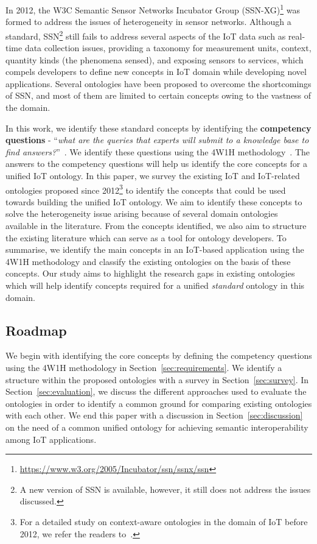 \documentclass{elsart}  %
\begin{document}
In 2012, the W3C Semantic Sensor Networks Incubator Group (SSN-XG)\footnote{\url{https://www.w3.org/2005/Incubator/ssn/ssnx/ssn}} was formed to address the issues of heterogeneity in sensor networks. Although a standard, SSN\footnote{A new version of SSN is available, however, it still does not address the issues discussed.} still fails to address several aspects of the IoT data such as real-time data collection issues, providing a taxonomy for measurement units, context, quantity kinds (the phenomena sensed), and exposing sensors to services, which compels developers to define new concepts in IoT domain while developing novel applications. Several ontologies have been proposed to overcome the shortcomings of SSN, and most of them are limited to certain concepts owing to the vastness of the domain.

In this work, we identify these standard concepts by identifying the \textbf{competency questions} - ``\emph{what are the queries that experts will submit to a knowledge base to find answers?}''~\cite{yan2015ontology}. We identify these questions using the 4W1H methodology~\cite{4w1hDescribing,4w1hcrowdsensing}. The answers to the competency questions will help us identify the core concepts for a unified IoT ontology. In this paper, we survey the existing IoT and IoT-related ontologies proposed since 2012\footnote{For a detailed study on context-aware ontologies in the domain of IoT before 2012, we refer the readers to~\cite{perera2014context}.} to identify the concepts that could be used towards building the unified IoT ontology. We aim to identify these concepts to solve the heterogeneity issue arising because of several domain ontologies available in the literature. From the concepts identified, we also aim to structure the existing literature which can serve as a tool for ontology developers. To summarise, we identify the main concepts in an IoT-based application using the 4W1H methodology and classify the existing ontologies on the basis of these concepts. Our study aims to highlight the research gaps in existing ontologies which will help identify concepts required for a unified \emph{standard} ontology in this domain.
\subsection*{Roadmap}
We begin with identifying the core concepts by defining the competency questions using the 4W1H methodology in Section~\ref{sec:requirements}. We identify a structure within the proposed ontologies with a survey in Section~\ref{sec:survey}. In Section~\ref{sec:evaluation}, we discuss the different approaches used to evaluate the ontologies in order to identify a common ground for comparing existing ontologies with each other. We end this paper with a discussion in Section~\ref{sec:discussion} on the need of a common unified ontology for achieving semantic interoperability among IoT applications.
\end{document}
